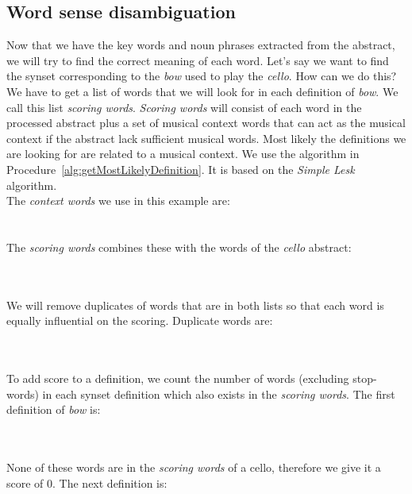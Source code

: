 \subsection{Word sense disambiguation}
Now that we have the key words and noun phrases extracted from the abstract, we will try to find the correct meaning of each word. Let's say we want to find the synset corresponding to the \emph{bow} used to play the \emph{cello}. How can we do this? We have to get a list of words that we will look for in each definition of \emph{bow}. We call this list \emph{scoring words}. \emph{Scoring words} will consist of each word in the processed abstract plus a set of musical context words that can act as the musical context if the abstract lack sufficient musical words. Most likely the definitions we are looking for are related to a musical context. We use the algorithm in Procedure~\ref{alg:getMostLikelyDefinition}. It is based on the \emph{Simple Lesk} algorithm.
\\The \emph{context words} we use in this example are:\\
\noindent{}
\\\\The \emph{scoring words} combines these with the words of the \emph{cello} abstract:

\noindent{}
\\\\We will remove duplicates of words that are in both lists so that each word is equally influential on the scoring. Duplicate words are:

\noindent{}
\\\\To add score to a definition, we count the number of words (excluding stop-words) in each synset definition which also exists in the \emph{scoring words}. The first definition of \emph{bow} is:

\noindent{}
\\\\None of these words are in the \emph{scoring words} of a cello, therefore we give it a score of 0. The next definition is:\\

